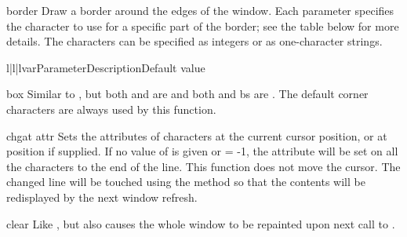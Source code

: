 \begin{methoddesc}[window]{border}{}
Draw a border around the edges of the window. Each parameter specifies 
the character to use for a specific part of the border; see the table
below for more details.  The characters can be specified as integers
or as one-character strings.


\begin{tableiii}{l|l|l}{var}{Parameter}{Description}{Default value}
\end{tableiii}
\end{methoddesc}

\begin{methoddesc}[window]{box}{}
Similar to , but both  and  are
 and both  and {bs} are .  The default
corner characters are always used by this function.
\end{methoddesc}

\begin{methoddesc}[window]{chgat}{  attr}
Sets the attributes of  characters at the current cursor
position, or at position  if supplied. If no
value of  is given or  = -1, the attribute will 
be set on all the characters to the end of the line. 
This function does not move the cursor. The changed line
will be touched using the  method so that the
contents will be redisplayed by the next window refresh.
\end{methoddesc}

\begin{methoddesc}[window]{clear}{}
Like , but also causes the whole window to be repainted
upon next call to .
\end{methoddesc}

